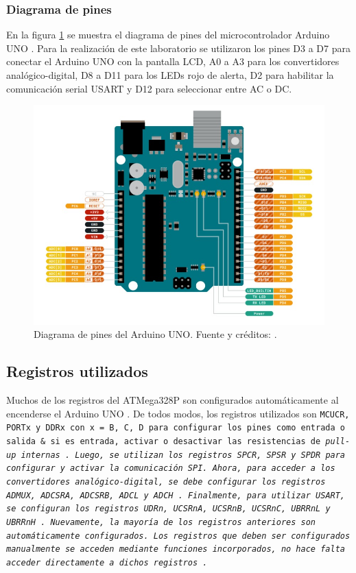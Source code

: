 \subsubsection{Diagrama de pines}

En la figura \ref{Fig: Diagrama_pines} se muestra el diagrama de pines del microcontrolador Arduino UNO \cite{datasheet}. Para la realización de este laboratorio se utilizaron los pines D3 a D7 para conectar el Arduino UNO con la pantalla LCD, A0 a A3 para los convertidores analógico-digital, D8 a D11 para los LEDs rojo de alerta, D2 para habilitar la comunicación serial USART y D12 para seleccionar entre AC o DC.

\begin{figure}[H]
\centering
\includegraphics[width=\textwidth]{Imagenes/Diagrama_Pines.jpg} 
\caption{Diagrama de pines del Arduino UNO. Fuente y créditos: \cite{datasheet}.}
\label{Fig: Diagrama_pines}
\end{figure}

\subsection{Registros utilizados}
Muchos de los registros del ATMega328P son configurados automáticamente al encenderse el Arduino UNO \cite{datasheet, atmega}. De todos modos, los registros utilizados son \tt{MCUCR}, \tt{PORTx} y \tt{DDRx} con \tt{x = B, C, D} para configurar los pines como entrada o salida \& si es entrada, activar o desactivar las resistencias de \it{pull-up internas} \cite{ atmega}.
Luego, se utilizan los registros \tt{SPCR}, \tt{SPSR} y \tt{SPDR} para configurar y activar la comunicación SPI. 
Ahora, para acceder a los convertidores analógico-digital, se debe configurar los registros \tt{ADMUX}, \tt{ADCSRA}, \tt{ADCSRB}, \tt{ADCL} y \tt{ADCH} \cite{ atmega}.
Finalmente, para utilizar USART, se configuran los registros \tt{UDRn}, \tt{UCSRnA}, \tt{UCSRnB}, \tt{UCSRnC}, \tt{UBRRnL} y \tt{UBRRnH} \cite{ atmega}.
Nuevamente, la mayoría de los registros anteriores son automáticamente configurados. Los registros que deben ser configurados manualmente se acceden mediante funciones incorporados, no hace falta acceder directamente a dichos registros \cite{datasheet, atmega}.



